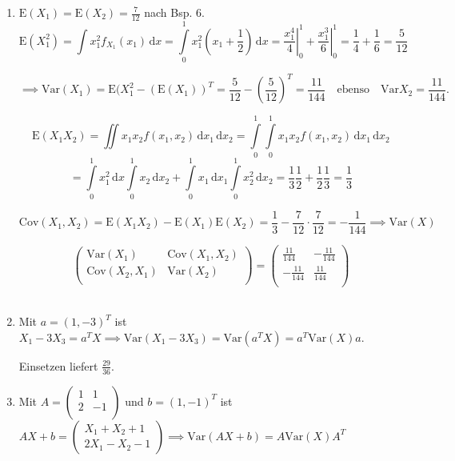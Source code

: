 \documentclass[12pt, a4paper]{article}
\newcommand{\E}{\mbox{I\negthinspace E}}
\theoremstyle{plain}
\theoremstyle{definition}
\newcommand{\1}{\mathds{1}}
\renewcommand{\E}{\mathrm{E}}
\newcommand{\Var}{\mathrm{Var}}
\newcommand{\Cov}{\mathrm{Cov}}
\renewcommand{\d}{\,\mathrm{d}}
\providecommand{\mtext}[1]{\quad \text{#1} \quad}
\providecommand{\eval}[1]{\left. #1 \right|}
\begin{document}
\begin{enumerate}
\item $\E(X_1) = \E(X_2) = \frac{7}{12}$ nach Bsp. 6. \\ 
\[\E(X_1^2) = \int x_1^2 f_{X_1}(x_1) \d x = \int\limits_0^1 x_1^2 (x_1 + \frac{1}{2}) \d x = \eval{\frac{x_1^4}{4}}_0^1 + \eval{\frac{x_1^3}{6}}_0^1
= \frac{1}{4} + \frac{1}{6} = \frac{5}{12} \]

\[\implies \Var(X_1) = \E(X_1^2 - (\E(X_1))^T = \frac{5}{12} - (\frac{5}{12})^T = \frac{11}{144} \mtext{ebenso} \Var{X_2} = \frac{11}{144}.\]

\[\E(X_1 X_2) = \iint x_1 x_2 f(x_1, x_2) \d x_1 \d x_2 = \int\limits_0^1 \int\limits_0^1 x_1 x_2 f(x_1, x_2) \d x_1 \d x_2 \]
\[= \int\limits_0^1 x_1^2 \d x \int\limits_0^1 x_2 \d x_2 + \int\limits_0^1 x_1 \d x_1 \int\limits_0^1 x_2^2 \d x_2 = \frac{1}{3} \frac{1}{2} + \frac{1}{2} \frac{1}{3} = \frac{1}{3}\]

\[\Cov(X_1, X_2) = \E(X_1 X_2) - \E(X_1) \E(X_2) = \frac{1}{3} - \frac{7}{12} \cdot \frac{7}{12} = -\frac{1}{144} \implies \Var(X) \]

\[ \begin{pmatrix}
\Var(X_1) & \Cov(X_1, X_2) \\
\Cov(X_2, X_1) & \Var(X_2) \\
\end{pmatrix}  =
\begin{pmatrix}
\frac{11}{144} & -\frac{11}{144}  \\
-\frac{11}{144} & \frac{11}{144} \\
\end{pmatrix} 
 \]\\

 \item Mit $a = (1, -3)^T$ ist $X_1 - 3X_3 = a^T X \implies \Var(X_1 - 3 X_3) =\Var(a^T X) = a^T \Var (X) a $. 

 Einsetzen liefert $\frac{29}{36}$.\\

 \item Mit $A = \begin{pmatrix} 1 & 1 \\ 2 & - 1 \\ \end{pmatrix}$ und $ b = (1, -1)^T$ ist $AX + b = \begin{pmatrix} X_1 + X_2 + 1 \\ 2X_1 - X_2 - 1 \end{pmatrix}  \implies \Var(AX + b) = A \Var(X) A^T$\\

\end{enumerate}
\end{document}
